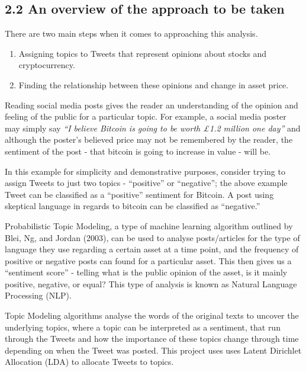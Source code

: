 \documentclass[
]{article}
\providecommand{\tightlist}{%
  \setlength{\itemsep}{0pt}\setlength{\parskip}{0pt}}
\begin{document}
\hypertarget{an-overview-of-the-approach-to-be-taken}{%
\subsection{2.2 An overview of the approach to be
taken}\label{an-overview-of-the-approach-to-be-taken}}

There are two main steps when it comes to approaching this analysis.

\begin{enumerate}
\def\labelenumi{\arabic{enumi}.}
\tightlist
\item
  Assigning topics to Tweets that represent opinions about stocks and
  cryptocurrency.
\item
  Finding the relationship between these opinions and change in asset
  price.
\end{enumerate}

Reading social media posts gives the reader an understanding of the
opinion and feeling of the public for a particular topic. For example, a
social media poster may simply say \emph{``I believe Bitcoin is going to
be worth £1.2 million one day''} and although the poster's believed
price may not be remembered by the reader, the sentiment of the post -
that bitcoin is going to increase in value - will be.

In this example for simplicity and demonstrative purposes, consider
trying to assign Tweets to just two topics - ``positive'' or
``negative''; the above example Tweet can be classified as a
``positive'' sentiment for Bitcoin. A post using skeptical language in
regards to bitcoin can be classified as ``negative.''

Probabilistic Topic Modeling, a type of machine learning algorithm
outlined by Blei, Ng, and Jordan (2003), can be used to analyse
posts/articles for the type of language they use regarding a certain
asset at a time point, and the frequency of positive or negative posts
can found for a particular asset. This then gives us a ``sentiment
score'' - telling what is the public opinion of the asset, is it mainly
positive, negative, or equal? This type of analysis is known as Natural
Language Processing (NLP).

Topic Modeling algorithms analyse the words of the original texts to
uncover the underlying topics, where a topic can be interpreted as a
sentiment, that run through the Tweets and how the importance of these
topics change through time depending on when the Tweet was posted. This
project uses uses Latent Dirichlet Allocation (LDA) to allocate Tweets
to topics.
\end{document}

